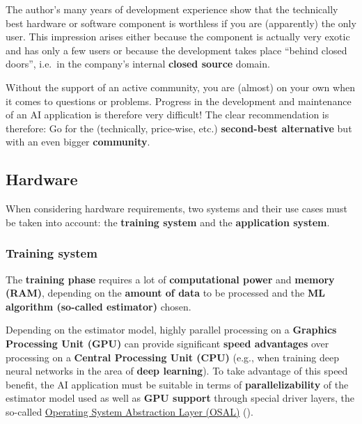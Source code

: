 \documentclass [oneside,10pt,a4paper,ngerman,BCOR10mm,headsepline,parindent,final]{scrartcl}
\begin{document}
The author's many years of development experience show that the
technically best hardware or software component is worthless if you are
(apparently) the only user. This impression arises either because the
component is actually very exotic and has only a few users or because
the development takes place ``behind closed doors'', i.e.~in the
company's internal \textbf{closed source} domain.

Without the support of an active community, you are (almost) on your own
when it comes to questions or problems. Progress in the development and
maintenance of an AI application is therefore very difficult! The clear
recommendation is therefore: Go for the (technically, price-wise, etc.)
\textbf{second-best alternative} but with an even bigger
\textbf{community}.

    \hypertarget{hardware}{%
\subsection{Hardware}\label{hardware}}

When considering hardware requirements, two systems and their use cases
must be taken into account: the \textbf{training system} and the
\textbf{application system}.

\hypertarget{training-system}{%
\subsubsection{Training system}\label{training-system}}

The \textbf{training phase} requires a lot of \textbf{computational
power} and \textbf{memory (RAM)}, depending on the \textbf{amount of
data} to be processed and the \textbf{ML algorithm (so-called
estimator)} chosen.

Depending on the estimator model, highly parallel processing on a
\textbf{Graphics Processing Unit (GPU)} can provide significant
\textbf{speed advantages} over processing on a \textbf{Central
Processing Unit (CPU)} (e.g., when training deep neural networks in the
area of \textbf{deep learning}). To take advantage of this speed
benefit, the AI application must be suitable in terms of
\textbf{parallelizability} of the estimator model used as well as
\textbf{GPU support} through special driver layers, the so-called
\href{https://en.wikipedia.org/wiki/Operating_system_abstraction_layer}{Operating
System Abstraction Layer (OSAL)} (\cite{Wiki_OSAL}).
\end{document}
